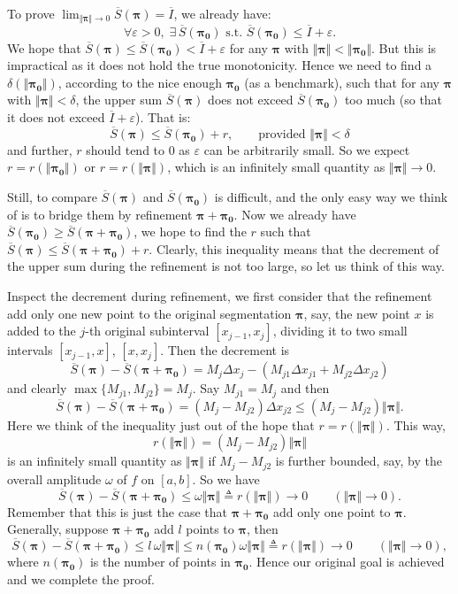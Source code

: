 \documentclass{article}
\newcommand{\usum}[1]{\overline{S}(\pmb{#1})}
\begin{document}
To prove $\lim_{\Vert\pmb{\pi}\Vert\to 0} \usum{\pi} = \overline{I}$, we already have:
$$ \forall \varepsilon > 0, \;\exists\, \usum{\pi_0} \text{ s.t. } \usum{\pi_0} \leq \overline{I} + \varepsilon. $$
We hope that $ \usum{\pi} \leq \usum{\pi_0} < \overline{I} + \varepsilon $ for any $\pmb{\pi}$ with $\Vert\pmb{\pi}\Vert < \Vert \pmb{\pi_0} \Vert$. But this is impractical as it does not hold the true monotonicity. Hence we need to find a $\delta (\Vert\pmb{\pi_0}\Vert)$, according to the nice enough $\pmb{\pi_0}$ (as a benchmark), such that for any $\pmb{\pi}$ with $\Vert\pmb{\pi}\Vert < \delta$, the upper sum $\usum{\pi}$ does not exceed $\usum{\pi_0}$ too much (so that it does not exceed $\overline{I} + \varepsilon$). That is:
$$ \usum{\pi} \leq \usum{\pi_0} + r, \qquad\text{provided } \Vert\pmb{\pi}\Vert < \delta $$
and further, $r$ should tend to 0 as $\varepsilon$ can be arbitrarily small. So we expect $r = r(\Vert\pmb{\pi_0}\Vert)$ or $r = r(\Vert\pmb{\pi}\Vert)$, which is an infinitely small quantity as $\Vert\pmb{\pi}\Vert\to 0$.

Still, to compare $\usum{\pi}$ and $\usum{\pi_0}$ is difficult, and the only easy way we think of is to bridge them by refinement $\pmb{\pi} + \pmb{\pi_0}$. Now we already have $\usum{\pi_0} \geq \usum{\pi+\pi_0}$, we hope to find the $r$ such that $\usum{\pi} \leq \usum{\pi+\pi_0} + r$. Clearly, this inequality means that the decrement of the upper sum during the refinement is not too large, so let us think of this way. 

Inspect the decrement during refinement, we first consider that the refinement add only one new point to the original segmentation $\pmb{\pi}$, say, the new point $x$ is added to the $j$-th original subinterval $[x_{j-1}, x_{j}]$, dividing it to two small intervals $[x_{j-1}, x]$, $[x, x_j]$. Then the decrement is 
$$ \usum{\pi} - \usum{\pi+\pi_0} = M_j\Delta x_j - (M_{j1}\Delta x_{j1} + M_{j2}\Delta x_{j2}) $$
and clearly $\max \{M_{j1}, M_{j2}\} = M_j$. Say $M_{j1} = M_j$ and then
$$ \usum{\pi} - \usum{\pi+\pi_0} = (M_j-M_{j2})\Delta x_{j2} \leq (M_j-M_{j2}) \Vert\pmb{\pi}\Vert. $$
Here we think of the inequality just out of the hope that $r = r(\Vert\pmb{\pi}\Vert)$. This way,
$$ r(\Vert\pmb{\pi}\Vert) = (M_j-M_{j2}) \Vert\pmb{\pi}\Vert $$
is an infinitely small quantity as $\Vert \pmb{\pi} \Vert$ if $M_j-M_{j2}$ is further bounded, say, by the overall amplitude $\omega$ of $f$ on $[a,b]$. So we have
$$ \usum{\pi} - \usum{\pi+\pi_0}\leq \omega \Vert\pmb{\pi}\Vert \triangleq r(\Vert\pmb{\pi}\Vert) \rightarrow 0 \qquad (\Vert\pmb{\pi}\Vert\to 0). $$
Remember that this is just the case that $\pmb{\pi} + \pmb{\pi_0}$ add only one point to $\pmb{\pi}$. Generally, suppose $\pmb{\pi} + \pmb{\pi_0}$ add $l$ points to $\pmb{\pi}$, then
$$ \usum{\pi} - \usum{\pi+\pi_0} \leq l\,\omega \Vert\pmb{\pi}\Vert \leq n(\pmb{\pi_0})\omega \Vert\pmb{\pi}\Vert \triangleq r(\Vert\pmb{\pi}\Vert) \rightarrow 0 \qquad (\Vert\pmb{\pi}\Vert\to 0), $$
where $n(\pmb{\pi_0})$ is the number of points in $\pmb{\pi_0}$. Hence our original goal is achieved and we complete the proof.
\end{document}
